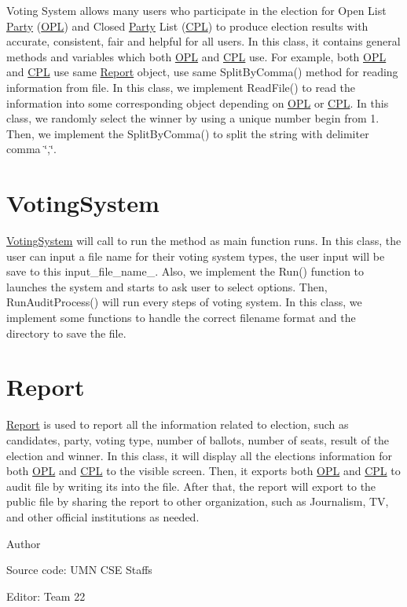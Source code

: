 Voting System allows many users who participate in the election for Open List \hyperlink{classParty}{Party} (\hyperlink{classOPL}{O\+PL}) and Closed \hyperlink{classParty}{Party} List (\hyperlink{classCPL}{C\+PL}) to produce election results with accurate, consistent, fair and helpful for all users. In this class, it contains general methods and variables which both \hyperlink{classOPL}{O\+PL} and \hyperlink{classCPL}{C\+PL} use. For example, both \hyperlink{classOPL}{O\+PL} and \hyperlink{classCPL}{C\+PL} use same \hyperlink{classReport}{Report} object, use same Split\+By\+Comma() method for reading information from file. In this class, we implement Read\+File() to read the information into some corresponding object depending on \hyperlink{classOPL}{O\+PL} or \hyperlink{classCPL}{C\+PL}. In this class, we randomly select the winner by using a unique number begin from 1. Then, we implement the Split\+By\+Comma() to split the string with delimiter comma \char`\"{},\char`\"{}.\hypertarget{index_voting_system}{}\section{Voting\+System}\label{index_voting_system}
\hyperlink{classVotingSystem}{Voting\+System} will call to run the method as main function runs. In this class, the user can input a file name for their voting system types, the user input will be save to this input\+\_\+file\+\_\+name\+\_\+. Also, we implement the Run() function to launches the system and starts to ask user to select options. Then, Run\+Audit\+Process() will run every steps of voting system. In this class, we implement some functions to handle the correct filename format and the directory to save the file.\hypertarget{index_report}{}\section{Report}\label{index_report}
\hyperlink{classReport}{Report} is used to report all the information related to election, such as candidates, party, voting type, number of ballots, number of seats, result of the election and winner. In this class, it will display all the election\textquotesingle{}s information for both \hyperlink{classOPL}{O\+PL} and \hyperlink{classCPL}{C\+PL} to the visible screen. Then, it exports both \hyperlink{classOPL}{O\+PL} and \hyperlink{classCPL}{C\+PL} to audit file by writing its into the file. After that, the report will export to the public file by sharing the report to other organization, such as Journalism, TV, and other official institutions as needed.

\begin{DoxyAuthor}{Author}

\begin{DoxyItemize}
\item Source code\+: U\+MN C\+SE Staffs
\item Editor\+: Team 22 
\end{DoxyItemize}
\end{DoxyAuthor}
